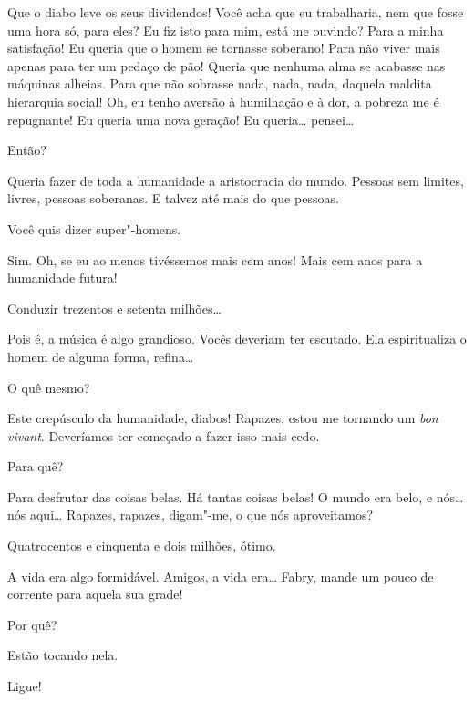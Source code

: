   Que o diabo leve os seus dividendos! Você acha que eu
trabalharia, nem que fosse uma hora só, para eles? 
 Eu fiz isto para mim, está me ouvindo? Para a minha satisfação! Eu
queria que o homem se tornasse soberano! Para não viver mais apenas para ter um
pedaço de pão! Queria que nenhuma alma se acabasse nas máquinas alheias. Para
que não sobrasse nada, nada, nada, daquela maldita hierarquia social! Oh, eu
tenho aversão à humilhação e à dor, a pobreza me é repugnante! Eu queria
uma nova geração! Eu queria\ldots{} pensei\ldots{}

 Então?

  Queria fazer de toda a humanidade a aristocracia do
mundo. Pessoas sem limites, livres, pessoas soberanas. E talvez até mais do
que pessoas.

 Você quis dizer super"-homens.

Sim. Oh, se eu ao menos tivéssemos mais cem anos! Mais cem anos para a
humanidade futura!

  Conduzir trezentos e setenta milhões\ldots{}

  Pois é, a música é algo
grandioso. Vocês deveriam ter escutado. Ela espiritualiza o homem de alguma
forma, refina\ldots{}

 O quê mesmo?

 Este crepúsculo da humanidade, diabos! Rapazes, estou me tornando um
\textit{bon vivant}. Deveríamos ter começado a fazer isso mais cedo. 

 Para quê?

 Para desfrutar das coisas belas. Há tantas coisas belas! O
mundo era belo, e nós\ldots{} nós aqui\ldots{} Rapazes, rapazes, digam"-me, o que nós
aproveitamos?

  Quatrocentos e cinquenta e dois milhões, ótimo.

  A vida era algo formidável. Amigos, a vida era\ldots{}
Fabry, mande um pouco de corrente para aquela sua grade!

 Por quê?

 Estão tocando nela.

  Ligue!

